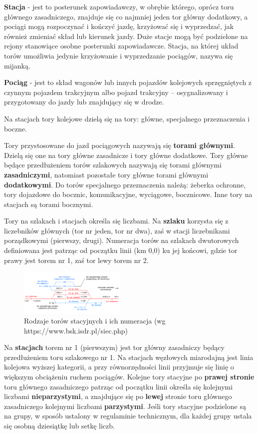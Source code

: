 \textbf{Stacja} - jest to posterunek zapowiadawczy, w obrębie którego, oprócz toru głównego zasadniczego, znajduje się co najmniej jeden tor główny dodatkowy, a pociągi mogą rozpoczynać i kończyć jazdę, krzyżować się i wyprzedzać, jak również zmieniać skład lub kierunek jazdy. Duże stacje mogą być podzielone na rejony stanowiące osobne posterunki zapowiadawcze. Stacja, na której układ torów umożliwia jedynie krzyżowanie i wyprzedzanie pociągów, nazywa się mijanką.

\textbf{Pociąg} - jest to skład wagonów lub innych pojazdów kolejowych sprzęgniętych z czynnym pojazdem trakcyjnym albo pojazd trakcyjny – osygnalizowany i przygotowany do jazdy lub znajdujący się w drodze.

Na stacjach tory kolejowe dzielą się na tory: główne, specjalnego przeznaczenia i boczne.

Tory przystosowane do jazd pociągowych nazywają się \textbf{torami głównymi}. Dzielą się one na tory główne zasadnicze i tory główne dodatkowe. Tory główne będące przedłużeniem torów szlakowych nazywają się torami głównymi \textbf{zasadniczymi}, natomiast pozostałe tory główne torami głównymi \textbf{dodatkowymi}. Do torów specjalnego przeznaczenia należą: żeberka ochronne, tory dojazdowe do bocznic, komunikacyjne, wyciągowe, bocznicowe. Inne tory na stacjach są torami bocznymi.

Tory na szlakach i stacjach określa się liczbami. Na \textbf{szlaku} korzysta się z liczebników głównych (tor nr jeden, tor nr dwa), zaś w stacji liczebnikami porządkowymi (pierwszy, drugi). Numeracja torów na szlakach dwutorowych definiowana jest patrząc od początku linii (km 0,0) ku jej końcowi, gdzie tor prawy jest torem nr 1, zaś tor lewy torem
nr 2.
	\begin{figure}
	\includegraphics[width=0.45\textwidth]{skryptkierownik-img/tory-numery.png}
	\caption{Rodzaje torów stacyjnych i ich numeracja (wg https://www.bsk.isdr.pl/siec.php)}
	\label{fig:numeracja-torow}
\end{figure}

Na \textbf{stacjach} torem nr 1 (pierwszym) jest tor główny zasadniczy będący przedłużeniem toru szlakowego nr 1. Na stacjach węzłowych miarodajną jest linia kolejowa wyższej kategorii, a przy równorzędności linii przyjmuje się linię o większym obciążeniu ruchem pociągów. Kolejne tory stacyjne po \textbf{prawej stronie} toru głównego zasadniczego patrząc od początku linii określa się kolejnymi liczbami \textbf{nieparzystymi}, a znajdujące się po \textbf{lewej} stronie toru głównego zasadniczego kolejnymi liczbami \textbf{parzystymi}. Jeśli tory stacyjne podzielone są na grupy, w sposób ustalony w regulaminie technicznym, dla każdej grupy ustala się osobną dziesiątkę lub setkę liczb.

